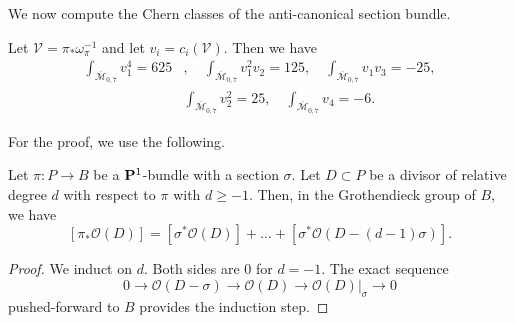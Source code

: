 \documentclass[reqno]{amsart}
\DeclareMathOperator{\M}{\mathcal{M}}
\renewcommand{\to}{{\longrightarrow}}
\renewcommand {\P}{{\bf P}}
\numberwithin{equation}{section}
\renewcommand{\O}{\mathcal{O}}
\begin{document}
We now compute the Chern classes of the anti-canonical section bundle.
\begin{proposition}\label{lem:v2}
  Let $\mathcal{V} = \pi_* \omega_{\pi}^{-1}$ and let $v_i = c_i(\mathcal{V})$.
  Then we have
  \[
    \begin{split}
      \int_{\overline{\M}_{0,7}}v_{1}^{4} = 625&, \quad \int_{\overline{\M}_{0,7}}v_{1}^{2}v_{2} = 125,\quad \int_{\overline{\M}_{0,7}}v_{1}v_{3} = -25,\\
      &\int_{\overline{\M}_{0,7}}v_2^{2} = 25,\quad \int_{\overline{\M}_{0,7}}v_{4} = -6.
    \end{split}
  \]
\end{proposition}
For the proof, we use the following.
\begin{lemma}\label{lem:push}
  Let $\pi \colon P \to B$ be a $\P^1$-bundle with a section $\sigma$.
  Let $D \subset P$ be a divisor of relative degree $d$ with respect to $\pi$ with $d \geq -1$.
  Then, in the Grothendieck group of $B$, we have
  \[ [\pi_* \O(D)] = [\sigma^*\O(D)] + \dots + [\sigma^*\O(D-(d-1)\sigma)].\]
\end{lemma}
\begin{proof}
  We induct on $d$.
  Both sides are 0 for $d = -1$.
  The exact sequence
  \[ 0 \to \O(D-\sigma) \to \O(D) \to \O(D)|_{\sigma} \to 0\]
  pushed-forward to $B$ provides the induction step.
\end{proof}
\end{document}
